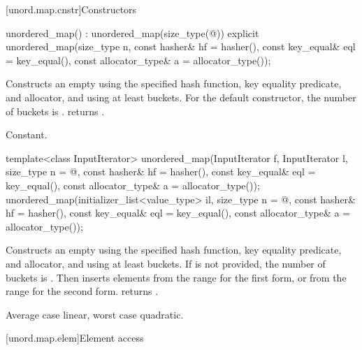 [unord.map.cnstr]{Constructors}

%
\begin{itemdecl}
unordered_map() : unordered_map(size_type(@\seebelow@)) { }
explicit unordered_map(size_type n,
                       const hasher& hf = hasher(),
                       const key_equal& eql = key_equal(),
                       const allocator_type& a = allocator_type());
\end{itemdecl}

\begin{itemdescr}
\pnum
\effects
Constructs an empty  using the
specified hash function, key equality predicate, and allocator, and
using at least  buckets.  For the default constructor,
the number of buckets is .
 returns .

\pnum
\complexity
Constant.
\end{itemdescr}

%
\begin{itemdecl}
template<class InputIterator>
  unordered_map(InputIterator f, InputIterator l,
                size_type n = @\seebelow@,
                const hasher& hf = hasher(),
                const key_equal& eql = key_equal(),
                const allocator_type& a = allocator_type());
unordered_map(initializer_list<value_type> il,
              size_type n = @\seebelow@,
              const hasher& hf = hasher(),
              const key_equal& eql = key_equal(),
              const allocator_type& a = allocator_type());
\end{itemdecl}

\begin{itemdescr}
\pnum
\effects
Constructs an empty  using the
specified hash function, key equality predicate, and allocator, and
using at least  buckets. If  is not
provided, the number of buckets is . Then
inserts elements from the range 
for the first form, or from the range
 for the second form.
 returns .

\pnum
\complexity
Average case linear, worst case quadratic.
\end{itemdescr}

[unord.map.elem]{Element access}

